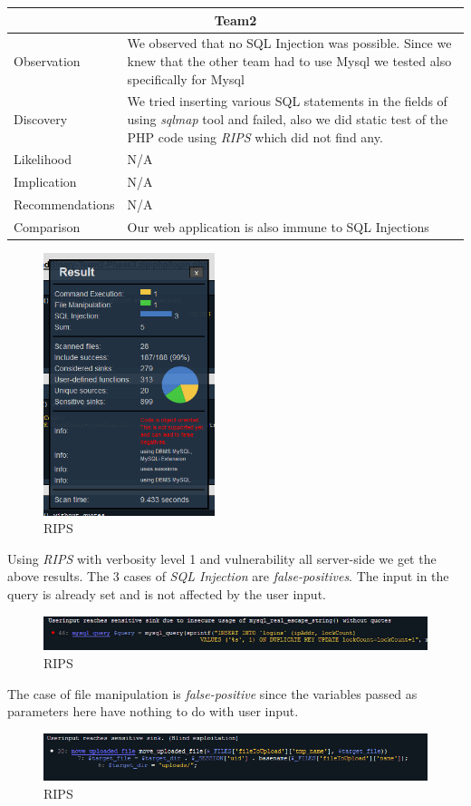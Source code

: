 \documentclass[headsepline,footsepline,footinclude=false,oneside,fontsize=11pt,paper=a4,listof=totoc,bibliography=totoc]{scrbook} %
\begin{document}
\begin{tabular}{ l|p{11cm}  }
	\hline
	\multicolumn{2}{c}{\textbf{Team2}} \\
	\hline
	Observation   & We observed that no SQL Injection was possible. Since we knew that the other team had
	to use Mysql we tested also specifically for Mysql \\
	Discovery  & We tried inserting various SQL statements in the fields of using \textit{sqlmap} tool and failed, also we did static test of the PHP code using \textit{RIPS} which did not find any.\\
	Likelihood & N/A \\
	Implication    & N/A \\
	Recommendations & N/A \\
	Comparison& Our web application is also immune to SQL Injections \\
	\hline
\end{tabular}
\begin{figure}[H]
	\centering
	\includegraphics[width=50mm]{logos/RIPS2.jpg}
	\caption{RIPS \label{overflow}}
\end{figure}
Using \textit{RIPS} with verbosity level 1  and vulnerability all server-side we get the above results.
The 3 cases of \textit{SQL Injection} are \textit{false-positives}. The input in the query is already set and is not affected by the user input.
\begin{figure}[H]
	\centering
	\includegraphics[width=170mm]{logos/Injection1.jpg}
	\caption{RIPS \label{overflow}}
\end{figure}

The case of file manipulation is \textit{false-positive} since the variables passed as parameters here have nothing to do with user input.
\begin{figure}[H]
	\centering
	\includegraphics[width=150mm]{logos/file1.jpg}
	\caption{RIPS \label{overflow}}
\end{figure} 
\end{document}
